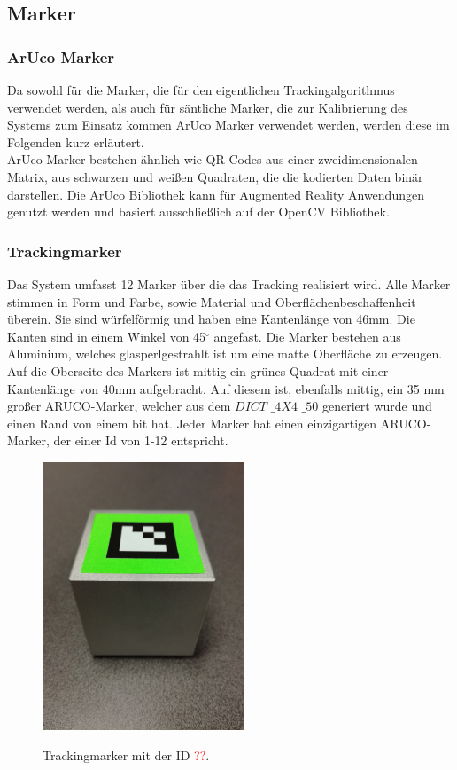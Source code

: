 \subsection{Marker}
\subsubsection{ArUco Marker}
Da sowohl für die Marker, die für den eigentlichen Trackingalgorithmus verwendet werden, als auch für säntliche Marker, die zur Kalibrierung des Systems zum Einsatz kommen ArUco Marker verwendet werden, werden diese im Folgenden kurz erläutert.\\
ArUco Marker bestehen ähnlich wie QR-Codes aus einer zweidimensionalen Matrix, aus schwarzen und weißen Quadraten, die die kodierten Daten binär darstellen. Die ArUco Bibliothek kann für Augmented Reality Anwendungen genutzt werden und basiert ausschließlich auf der OpenCV Bibliothek. 
 
\subsubsection{Trackingmarker}
Das System umfasst 12 Marker über die das Tracking realisiert wird. Alle Marker stimmen in Form und Farbe, sowie Material und Oberflächenbeschaffenheit überein. Sie sind würfelförmig und haben eine Kantenlänge von 46mm. Die Kanten sind in einem Winkel von 45$^\circ$ angefast. Die Marker bestehen aus Aluminium, welches glasperlgestrahlt ist um eine matte Oberfläche zu erzeugen. Auf die Oberseite des Markers ist mittig ein grünes Quadrat mit einer Kantenlänge von 40mm aufgebracht. Auf diesem ist, ebenfalls mittig, ein 35 mm großer ARUCO-Marker, welcher aus dem $\textit{DICT \_4X4 \_50}$ generiert wurde und einen Rand von einem bit hat. Jeder Marker hat einen einzigartigen ARUCO-Marker, der einer Id von 1-12 entspricht. 


	\begin{figure}[H]
		\center 
		\includegraphics[trim = 0mm 280mm 0mm 150mm, clip, width=6cm]{Bilder/tracking-marker.jpg}
			\label{fig:marker}
			\caption{Trackingmarker mit der ID \textcolor{red}{??}.}
	\end{figure}


